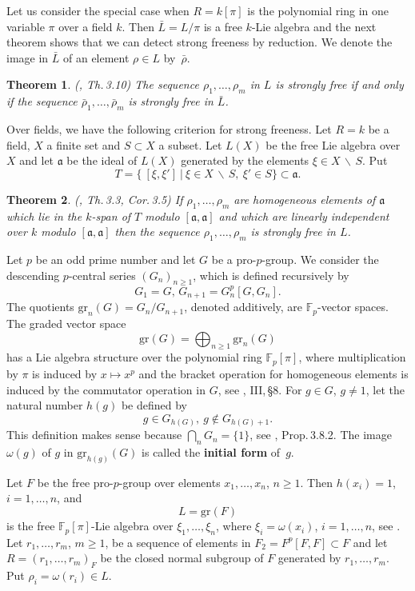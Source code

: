 \documentclass[10pt]{article}
\newcommand{\F}{{\mathbb F}}
\newcommand{\sm}{{\,\smallsetminus\,}}
\newcommand{\gr}{\textrm{gr}}
\renewcommand{\a}{\mathfrak{a}}
\theoremstyle{alex}
\newtheorem{theorem}{Theorem}[section]
\theoremstyle{alexdef}
\begin{document}
Let us consider the special case when $R=k[\pi]$ is the polynomial ring in one variable $\pi$ over a field $k$. Then $\bar L=L/\pi$ is a free $k$-Lie algebra and the next theorem shows that we can detect strong freeness by reduction. We denote the image in $\bar L$ of an element $\rho \in L$ by~$\bar \rho$.

\begin{theorem} {\rm(\cite{La}, Th.\,3.10)} \label{mildreduction}
The sequence $\rho_1,\ldots,\rho_m$ in $L$ is strongly free if and only if the sequence $\bar \rho_1,\ldots,\bar \rho_m$ is strongly free in $\bar L$.
\end{theorem}

Over fields, we have the following criterion for strong freeness. Let $R=k$ be a field, $X$  a finite set and $S\subset X$ a subset. Let $L(X)$ be the free Lie algebra over $X$ and let $\a$ be the ideal of $L(X)$ generated by the elements $\xi \in X\sm S$.
Put
\[
T=\{\ [\xi,\xi'] \ | \ \xi\in X\sm S,\ \xi' \in S  \} \subset \a.
\]

\begin{theorem}{\rm (\cite{La}, Th.\,3.3, Cor.\,3.5)} \label{mildoverfield} If $\rho_1,\ldots,\rho_m$ are homogeneous elements of $\a$ which lie in the $k$-span of\/ $T$ modulo $[\a,\a]$ and which are linearly independent over $k$ modulo $[\a,\a]$ then the sequence $\rho_1,\ldots,\rho_m$ is strongly free in $L$.
\end{theorem}

Let $p$ be an odd prime number and let $G$ be a pro-$p$-group. We consider the descending $p$-central series $(G_n)_{n\geq 1}$, which is defined recursively by
\[
G_1=G,\, G_{n+1}=G_n^p[G,G_n].
\]
The quotients $\gr_n(G)=G_n/G_{n+1}$, denoted additively, are $\F_p$-vector spaces. The graded vector space
\[
\gr(G)=\bigoplus_{n\geq 1} \gr_n(G)
\]
has a Lie algebra structure over the polynomial ring $\F_p[\pi]$, where multiplication by $\pi$ is induced by $x\mapsto x^p$ and the bracket operation for homogeneous elements is induced by the commutator operation in $G$, see \cite{NSW}, III,\,\S8. For $g\in G$, $g\neq 1$, let the natural number $h(g)$ be defined by
\[
g \in G_{h(G)},\ g\notin G_{h(G)+1}.
\]
This definition makes sense because $\bigcap_n G_n=\{1\}$, see \cite{NSW}, Prop.\,3.8.2. The image $\omega(g)$ of $g$ in $\gr_{h(g)}(G)$ is called the {\bf initial form} of~$g$.

\medskip
Let $F$ be the free pro-$p$-group over elements $x_1,\ldots,x_n$, $n\geq 1$. Then $h(x_i)=1$, $i=1,\ldots,n$, and
\[
L= \gr(F)
\]
is the free $\F_p[\pi]$-Lie algebra over $\xi_1,\ldots,\xi_n$, where $\xi_i=\omega(x_i)$, $i=1,\ldots,n$, see \cite{Lz}. Let $r_1,\ldots, r_m$, $m\geq 1$, be a sequence of elements in $F_2=F^p[F,F]\subset F$ and let $R=(r_1,\ldots,r_m)_F$ be the closed normal subgroup of $F$ generated by $r_1,\ldots,r_m$. Put $\rho_i=\omega(r_i) \in L$.
\end{document}
